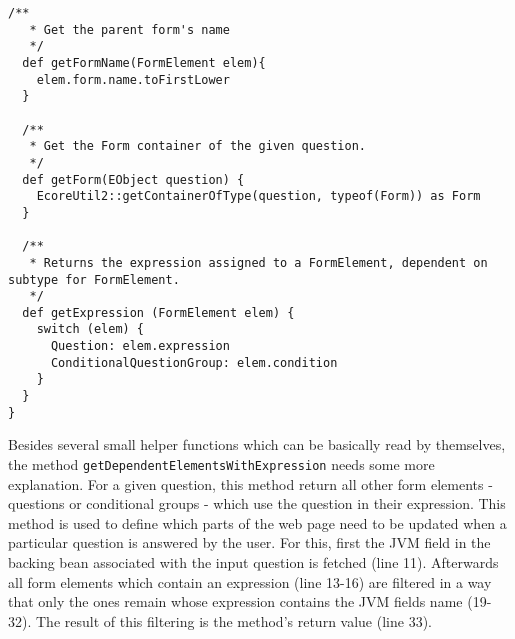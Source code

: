 \begin{lstlisting}[language=Xtend]
  /**
   * Get the parent form's name
   */
  def getFormName(FormElement elem){ 
    elem.form.name.toFirstLower
  }

  /**
   * Get the Form container of the given question. 
   */
  def getForm(EObject question) {
	EcoreUtil2::getContainerOfType(question, typeof(Form)) as Form
  }

  /**
   * Returns the expression assigned to a FormElement, dependent on subtype for FormElement. 
   */
  def getExpression (FormElement elem) {
    switch (elem) {
      Question: elem.expression
      ConditionalQuestionGroup: elem.condition
    }
  }
}
\end{lstlisting}

Besides several small helper functions which can be basically read by
themselves, the method \texttt{getDependentElementsWithExpression} needs some
more explanation. For a given question, this method return all other
form elements - questions or conditional groups - which use the question in
their expression. This method is used to define which parts of the web page need
to be updated when a particular question is answered by the user. For this,
first the JVM field in the backing bean associated with the input question is
fetched (line 11). Afterwards all form elements which contain an expression
(line 13-16) are filtered in a way that only the ones remain whose expression
contains the JVM fields name (19-32). The result of this filtering is the
method's return value (line 33).
